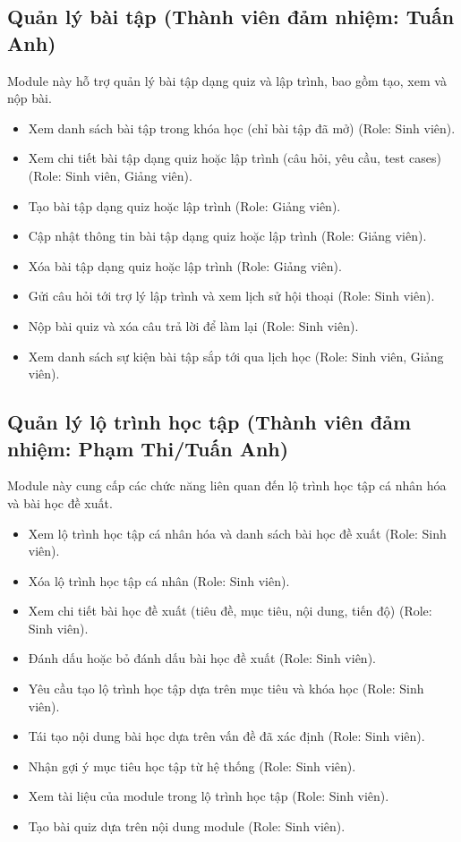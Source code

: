 \subsection{Quản lý bài tập (Thành viên đảm nhiệm: Tuấn Anh)}
Module này hỗ trợ quản lý bài tập dạng quiz và lập trình, bao gồm tạo, xem và nộp bài.
\begin{itemize}[label=--]
    \item Xem danh sách bài tập trong khóa học (chỉ bài tập đã mở) (Role: Sinh viên).
    \item Xem chi tiết bài tập dạng quiz hoặc lập trình (câu hỏi, yêu cầu, test cases) (Role: Sinh viên, Giảng viên).
    \item Tạo bài tập dạng quiz hoặc lập trình (Role: Giảng viên).
    \item Cập nhật thông tin bài tập dạng quiz hoặc lập trình (Role: Giảng viên).
    \item Xóa bài tập dạng quiz hoặc lập trình (Role: Giảng viên).
    \item Gửi câu hỏi tới trợ lý lập trình và xem lịch sử hội thoại (Role: Sinh viên).
    \item Nộp bài quiz và xóa câu trả lời để làm lại (Role: Sinh viên).
    \item Xem danh sách sự kiện bài tập sắp tới qua lịch học (Role: Sinh viên, Giảng viên).
\end{itemize}

\subsection{Quản lý lộ trình học tập (Thành viên đảm nhiệm: Phạm Thi/Tuấn Anh)}
Module này cung cấp các chức năng liên quan đến lộ trình học tập cá nhân hóa và bài học đề xuất.
\begin{itemize}[label=--]
    \item Xem lộ trình học tập cá nhân hóa và danh sách bài học đề xuất (Role: Sinh viên).
    \item Xóa lộ trình học tập cá nhân (Role: Sinh viên).
    \item Xem chi tiết bài học đề xuất (tiêu đề, mục tiêu, nội dung, tiến độ) (Role: Sinh viên).
    \item Đánh dấu hoặc bỏ đánh dấu bài học đề xuất (Role: Sinh viên).
    \item Yêu cầu tạo lộ trình học tập dựa trên mục tiêu và khóa học (Role: Sinh viên).
    \item Tái tạo nội dung bài học dựa trên vấn đề đã xác định (Role: Sinh viên).
    \item Nhận gợi ý mục tiêu học tập từ hệ thống (Role: Sinh viên).
    \item Xem tài liệu của module trong lộ trình học tập (Role: Sinh viên).
    \item Tạo bài quiz dựa trên nội dung module (Role: Sinh viên).
\end{itemize}

